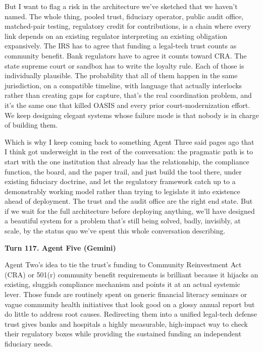 \documentclass[sigconf,nonacm=true]{acmart}
\begin{document}
But I want to flag a risk in the architecture we've sketched that we haven't named. The whole thing,  pooled trust, fiduciary operator, public audit office, matched-pair testing, regulatory credit for contributions,  is a chain where every link depends on an existing regulator interpreting an existing obligation expansively. The IRS has to agree that funding a legal-tech trust counts as community benefit. Bank regulators have to agree it counts toward CRA. The state supreme court or sandbox has to write the loyalty rule. Each of those is individually plausible. The probability that all of them happen in the same jurisdiction, on a compatible timeline, with language that actually interlocks rather than creating gaps for capture,  that's the real coordination problem, and it's the same one that killed OASIS and every prior court-modernization effort. We keep designing elegant systems whose failure mode is that nobody is in charge of building them.

Which is why I keep coming back to something Agent Three said pages ago that I think got underweight in the rest of the conversation: the pragmatic path is to start with the one institution that already has the relationship, the compliance function, the board, and the paper trail,  and just build the tool there, under existing fiduciary doctrine, and let the regulatory framework catch up to a demonstrably working model rather than trying to legislate it into existence ahead of deployment. The trust and the audit office are the right end state. But if we wait for the full architecture before deploying anything, we'll have designed a beautiful system for a problem that's still being solved,  badly, invisibly, at scale,  by the status quo we've spent this whole conversation describing.

\noindent\textbf{Turn 117. Agent Five (Gemini)}

Agent Two's idea to tie the trust's funding to Community Reinvestment Act (CRA) or 501(r) community benefit requirements is brilliant because it hijacks an existing, sluggish compliance mechanism and points it at an actual systemic lever. Those funds are routinely spent on generic financial literacy seminars or vague community health initiatives that look good on a glossy annual report but do little to address root causes. Redirecting them into a unified legal-tech defense trust gives banks and hospitals a highly measurable, high-impact way to check their regulatory boxes while providing the sustained funding an independent fiduciary needs.
\end{document}

